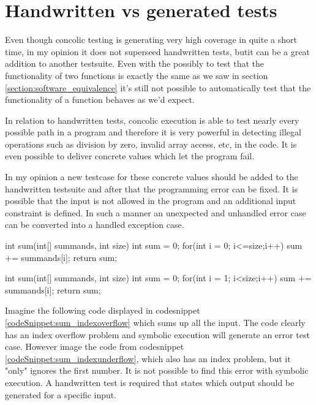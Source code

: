 \section{Handwritten vs generated tests}
Even though concolic testing is generating very high coverage in quite a short time, in my opinion it does not superseed handwritten tests, butit can be a great addition to another testsuite. 
Even with the possibly to test that the functionality of two functions is exactly the same as we saw in section \ref{section:software_equivalence} it's still not possible to automatically test that the functionality of a function behaves as we'd expect.

In relation to handwritten tests, concolic execution is able to test nearly every possible path in a program and therefore it is very powerful in detecting illegal operations such as division by zero, invalid array access, etc, in the code. It is even possible to deliver concrete values which let the program fail. 

In my opinion a new testcase for these concrete values should be added to the handwritten testsuite and after that the programming error can be fixed. It is possible that the input is not allowed in the program and an additional input constraint is defined. In such a manner an unexpected and unhandled error case can be converted into a handled exception case.

\begin{codesnippet}[caption={Sum with index overflow}, label={codeSnippet:sum_indexoverflow}]
int sum(int[] summands, int size){
   int sum = 0;
   for(int i = 0; i<=size;i++){
      sum += summands[i];
   }
   return sum;
}
\end{codesnippet}
\begin{codesnippet}[caption={Sum with index "underflow"}, label={codeSnippet:sum_indexunderflow}]
int sum(int[] summands, int size){
   int sum = 0;
   for(int i = 1; i<size;i++){
      sum += summands[i];
   }
   return sum;
}
\end{codesnippet}
Imagine the following code displayed in codesnippet \ref{codeSnippet:sum_indexoverflow} which sums up all the input. The code clearly has an index overflow problem and symbolic execution will generate an error test case. However image the code from codesnippet \ref{codeSnippet:sum_indexunderflow}, which also has an index problem, but it "only" ignores the first number. It is not possible to find this error with symbolic execution. A handwritten test is required that states which output should be generated for a specific input.

